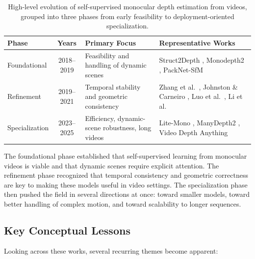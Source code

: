 \documentclass[10pt,twocolumn,letterpaper]{article}
\begin{document}
\begin{table}[t]
\centering
\footnotesize
\begin{tabularx}{\textwidth}{|l|c|p{3cm}|X|}
\hline
\textbf{Phase} & \textbf{Years} & \textbf{Primary Focus} & \textbf{Representative Works} \\
\hline
Foundational & 2018--2019 & Feasibility and handling of dynamic scenes & Struct2Depth \cite{casser2019depth}, Monodepth2 \cite{godard2019digging}, PackNet-SfM \cite{guizilini20203d} \\
\hline
Refinement & 2019--2021 & Temporal stability and geometric consistency & Zhang et al.\ \cite{zhang2019exploiting}, Johnston \& Carneiro \cite{johnston2020self}, Luo et al.\ \cite{luo2020consistent}, Li et al.\ \cite{li2021enforcing} \\
\hline
Specialization & 2023--2025 & Efficiency, dynamic-scene robustness, long videos & Lite-Mono \cite{zhang2023lite}, ManyDepth2 \cite{zhou2024manydepth2}, Video Depth Anything \cite{chen2025video} \\
\hline
\end{tabularx}
\caption{High-level evolution of self-supervised monocular depth estimation from videos, grouped into three phases from early feasibility to deployment-oriented specialization.}
\label{tab:evolution}
\end{table}

The foundational phase established that self-supervised learning from monocular videos is viable and that dynamic scenes require explicit attention. The refinement phase recognized that temporal consistency and geometric correctness are key to making these models useful in video settings. The specialization phase then pushed the field in several directions at once: toward smaller models, toward better handling of complex motion, and toward scalability to longer sequences.

\subsection{Key Conceptual Lessons}

Looking across these works, several recurring themes become apparent:
\end{document}
